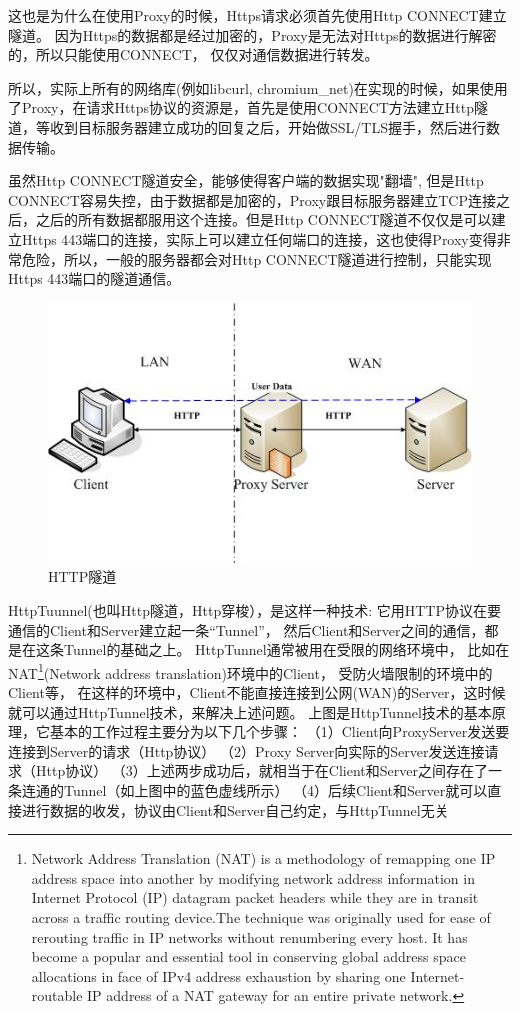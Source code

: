 \documentclass{book}
\begin{document}
这也是为什么在使用Proxy的时候，Https请求必须首先使用Http CONNECT建立隧道。
因为Https的数据都是经过加密的，Proxy是无法对Https的数据进行解密的，所以只能使用CONNECT，
仅仅对通信数据进行转发。

所以，实际上所有的网络库(例如libcurl, chromium\_net)在实现的时候，如果使用了Proxy，在请求Https协议的资源是，首先是使用CONNECT方法建立Http隧道，等收到目标服务器建立成功的回复之后，开始做SSL/TLS握手，然后进行数据传输。

虽然Http CONNECT隧道安全，能够使得客户端的数据实现"翻墙", 但是Http CONNECT容易失控，由于数据都是加密的，Proxy跟目标服务器建立TCP连接之后，之后的所有数据都服用这个连接。但是Http CONNECT隧道不仅仅是可以建立Https 443端口的连接，实际上可以建立任何端口的连接，这也使得Proxy变得非常危险，所以，一般的服务器都会对Http CONNECT隧道进行控制，只能实现Https 443端口的隧道通信。

\begin{figure}[htbp]
	\centering
	\includegraphics[scale=0.8]{HttpTunnel.jpg}
	\caption{HTTP隧道}
	\label{fig:HttpTunnel}
\end{figure}

HttpTuunnel(也叫Http隧道，Http穿梭），是这样一种技术: 
它用HTTP协议在要通信的Client和Server建立起一条“Tunnel”，
然后Client和Server之间的通信，都是在这条Tunnel的基础之上。
HttpTunnel通常被用在受限的网络环境中，
比如在NAT\footnote{Network Address Translation (NAT) is a methodology 
of remapping one IP address space into another by 
modifying network address information in Internet Protocol (IP) 
datagram packet headers while they are in transit across a 
traffic routing device.The technique was originally used for ease 
of rerouting traffic in IP networks without renumbering every host. 
It has become a popular and essential tool in conserving global 
address space allocations in face of IPv4 address exhaustion 
by sharing one Internet-routable IP address of a NAT gateway 
for an entire private network.}(Network address translation)环境中的Client，
受防火墙限制的环境中的Client等，
在这样的环境中，Client不能直接连接到公网(WAN)的Server，这时候就可以通过HttpTunnel技术，来解决上述问题。
上图是HttpTunnel技术的基本原理，它基本的工作过程主要分为以下几个步骤：
（1）Client向ProxyServer发送要连接到Server的请求（Http协议）
（2）Proxy Server向实际的Server发送连接请求（Http协议）
（3）上述两步成功后，就相当于在Client和Server之间存在了一条连通的Tunnel（如上图中的蓝色虚线所示）
（4）后续Client和Server就可以直接进行数据的收发，协议由Client和Server自己约定，与HttpTunnel无关
\end{document}
